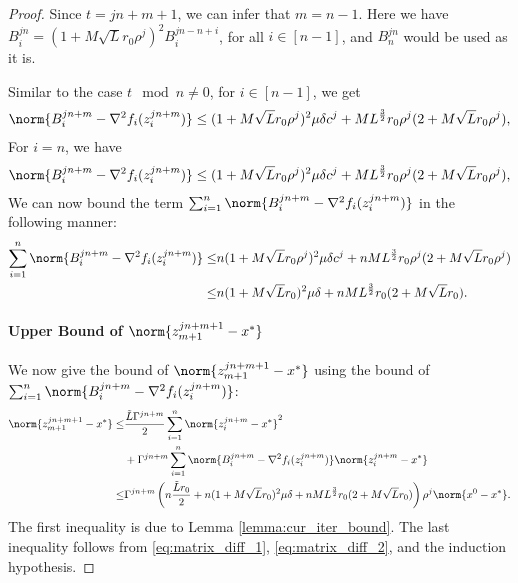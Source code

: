 \begin{proof}
    Since $t = j n + m + 1$, we can infer that $m = n -1$. Here we have $B_{i}^{j n} = (1 + M \sqrt{L} r_0 \rho^j)^2 B_i^{j n - n + i}$, for all $i \in [n-1]$, and $B_n^{jn}$ would be used as it is.

    Similar to the case $t \mod n \neq 0$, for $i \in [n - 1]$, we get
    \begin{align*}
        \norm{B_i^{j n + m} - \nabla^2 f_i(z_i^{j n + m})} \leq (1 + M \sqrt{L} r_0 \rho^j)^2 \mu \delta c^j + M L^{\frac{3}{2}} r_0 \rho^j (2 + M \sqrt{L} r_0 \rho^j), 
    \end{align*}
    For $i=n$, we have
     \begin{align*}
        \norm{B_i^{j n + m} - \nabla^2 f_i(z_i^{j n + m})} \leq (1 + M \sqrt{L} r_0 \rho^j)^2 \mu \delta c^j + M L^{\frac{3}{2}} r_0 \rho^j (2 + M \sqrt{L} r_0 \rho^j), 
    \end{align*}
    We can now bound the term $\sum_{i=1}^n \norm{B_{i}^{j n + m} - \nabla^2 f_i (z_i^{j n + m})}$ in the following manner:
    \begin{equation}
    \begin{split}
        \sum_{i=1}^n \norm{B_{i}^{j n + m} - \nabla^2 f_i (z_i^{j n + m})} \leq & n (1 + M \sqrt{L} r_0 \rho^j)^2 \mu \delta c^j + n M L^{\frac{3}{2}} r_0 \rho^j (2 + M \sqrt{L} r_0 \rho^j) \\
        \leq & n (1 + M \sqrt{L} r_0 )^2 \mu \delta  + n M L^{\frac{3}{2}} r_0  (2 + M \sqrt{L} r_0 ).
    \end{split}
    \label{eq:matrix_diff_2}
    \end{equation}
    \paragraph{Upper Bound of $\norm{z_{m+1}^{j n + m + 1} - x^ * }$} 
    We now give the bound of $\norm{z_{m+1}^{j n + m + 1} - x^ * }$ using the bound of $\sum_{i=1}^n \norm{B_i^{j n + m} - \nabla^2 f_i (z_i^{j n + m})}$:
    \begin{align*}
        \norm{z_{m+1}^{j n + m + 1} - x^*} \leq &\frac{\Tilde{L} \Gamma^{j n + m}}{2} \sum_{i=1}^n \norm{z_i^{j n + m} - x^*}^2 \\
        & + \Gamma^{j n + m} \sum_{i=1}^n \norm{B_i^{j n + m} - \nabla^2 f_i (z_i^{j n + m})} \norm{z_i^{j n + m} - x^*} \\
        \leq & \Gamma^{j n + m}\left( n \frac{\Tilde{L} r_0 }{ 2} + n (1 + M \sqrt{L} r_0 )^2 \mu \delta  + n M L^{\frac{3}{2}} r_0  (2 + M \sqrt{L} r_0 ) \right) \rho^j \norm{x^0 - x^*}.
    \end{align*}
    The first inequality is due to Lemma \ref{lemma:cur_iter_bound}. The last inequality follows from \eqref{eq:matrix_diff_1}, \eqref{eq:matrix_diff_2}, and the induction hypothesis.


\end{proof}
